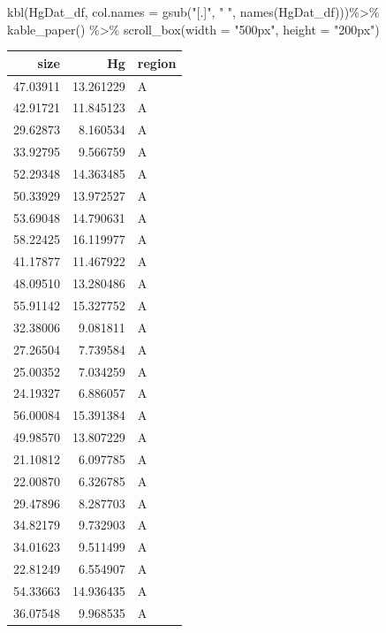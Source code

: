 \documentclass[
  letterpaper,
  DIV=11,
  numbers=noendperiod]{scrartcl}
\newenvironment{Shaded}{\begin{snugshade}}{\end{snugshade}}
\newcommand{\AttributeTok}[1]{\textcolor[rgb]{0.40,0.45,0.13}{#1}}
\newcommand{\FunctionTok}[1]{\textcolor[rgb]{0.28,0.35,0.67}{#1}}
\newcommand{\NormalTok}[1]{\textcolor[rgb]{0.00,0.23,0.31}{#1}}
\newcommand{\SpecialCharTok}[1]{\textcolor[rgb]{0.37,0.37,0.37}{#1}}
\newcommand{\StringTok}[1]{\textcolor[rgb]{0.13,0.47,0.30}{#1}}
\begin{document}
\begin{Shaded}
\begin{Highlighting}[]
\FunctionTok{kbl}\NormalTok{(HgDat\_df, }\AttributeTok{col.names =} \FunctionTok{gsub}\NormalTok{(}\StringTok{"[.]"}\NormalTok{, }\StringTok{" "}\NormalTok{, }\FunctionTok{names}\NormalTok{(HgDat\_df)))}\SpecialCharTok{\%\textgreater{}\%}
  \FunctionTok{kable\_paper}\NormalTok{() }\SpecialCharTok{\%\textgreater{}\%}
  \FunctionTok{scroll\_box}\NormalTok{(}\AttributeTok{width =} \StringTok{"500px"}\NormalTok{, }\AttributeTok{height =} \StringTok{"200px"}\NormalTok{)}
\end{Highlighting}
\end{Shaded}

\begin{table}
\centering
\begin{tabular}[t]{r|r|l}
\hline
size & Hg & region\\
\hline
47.03911 & 13.261229 & A\\
\hline
42.91721 & 11.845123 & A\\
\hline
29.62873 & 8.160534 & A\\
\hline
33.92795 & 9.566759 & A\\
\hline
52.29348 & 14.363485 & A\\
\hline
50.33929 & 13.972527 & A\\
\hline
53.69048 & 14.790631 & A\\
\hline
58.22425 & 16.119977 & A\\
\hline
41.17877 & 11.467922 & A\\
\hline
48.09510 & 13.280486 & A\\
\hline
55.91142 & 15.327752 & A\\
\hline
32.38006 & 9.081811 & A\\
\hline
27.26504 & 7.739584 & A\\
\hline
25.00352 & 7.034259 & A\\
\hline
24.19327 & 6.886057 & A\\
\hline
56.00084 & 15.391384 & A\\
\hline
49.98570 & 13.807229 & A\\
\hline
21.10812 & 6.097785 & A\\
\hline
22.00870 & 6.326785 & A\\
\hline
29.47896 & 8.287703 & A\\
\hline
34.82179 & 9.732903 & A\\
\hline
34.01623 & 9.511499 & A\\
\hline
22.81249 & 6.554907 & A\\
\hline
54.33663 & 14.936435 & A\\
\hline
36.07548 & 9.968535 & A\\

\end{tabular}
\end{table}
\end{document}
